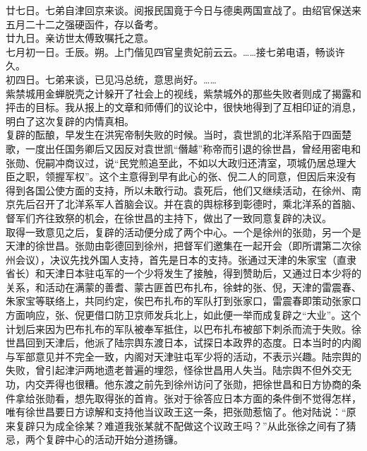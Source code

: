 廿七日。七弟自津回京来谈。阅报民国竟于今日与德奥两国宣战了。由绍官保送来五月二十二之强硬函件，存以备考。\\

廿九日。亲访世太傅致嘱托之意。\\

七月初一日。壬辰。朔。上门偕见四官皇贵妃前云云。……接七弟电语，畅谈许久。\\

初四日。七弟来谈，已见冯总统，意思尚好。……\\

紫禁城用金蝉脱壳之计躲开了社会上的视线，紫禁城外的那些失败者则成了揭露和抨击的目标。我从报上的文章和师傅们的议论中，很快地得到了互相印证的消息，明白了这次复辟的内情真相。\\

复辟的酝酿，早发生在洪宪帝制失败的时候。当时，袁世凯的北洋系陷于四面楚歌，一度出任国务卿后又因反对袁世凯“僭越”称帝而引退的徐世昌，曾经用密电和张勋、倪嗣冲商议过，说“民党煎追至此，不如以大政归还清室，项城仍居总理大臣之职，领握军权”。这个主意得到早有此心的张、倪二人的同意，但因后来没有得到各国公使方面的支持，所以未敢行动。袁死后，他们又继续活动，在徐州、南京先后召开了北洋系军人首脑会议。并在袁的舆棕移到彰德时，乘北洋系的首脑、督军们齐往致祭的机会，在徐世昌的主持下，做出了一致同意复辟的决议。\\

取得一致意见之后，复辟的活动便分成了两个中心。一个是徐州的张勋，另一个是天津的徐世昌。张勋由彰德回到徐州，把督军们邀集在一起开会（即所谓第二次徐州会议），决议先找外国人支持，首先是日本的支持。张通过天津的朱家宝（直隶省长）和天津日本驻屯军的一个少将发生了接触，得到赞助后，又通过日本少将的关系，和活动在满蒙的善耆、蒙古匪首巴布扎布，徐蚌的张、倪，天津的雷震春、朱家宝等联络上，共同约定，俟巴布扎布的军队打到张家口，雷震春即策动张家口方面响应，张、倪更借口防卫京师发兵北上，如此便一举而成复辟之“大业”。这个计划后来因为巴布扎布的军队被奉军抵住，以巴布扎布被部下刺杀而流于失败。徐世昌回到天津后，他派了陆宗舆东渡日本，试探日本政界的态度。日本当时的内阁与军部意见并不完全一致，内阁对天津驻屯军少将的活动，不表示兴趣。陆宗舆的失败，曾引起津沪两地遗老普遍的埋怨，怪徐世昌用人失当。陆宗舆不但外交无功，内交弄得也很糟。他东渡之前先到徐州访问了张勋，把徐世昌和日方协商的条件拿给张勋看，想先取得张的首肯。张对于徐答应日本方面的条件倒不觉得怎样，唯有徐世昌要日方谅解和支持他当议政王这一条，把张勋惹恼了。他对陆说：“原来复辟只为成全徐某？难道我张某就不配做这个议政王吗？”从此张徐之间有了猜忌，两个复辟中心的活动开始分道扬镰。\\

